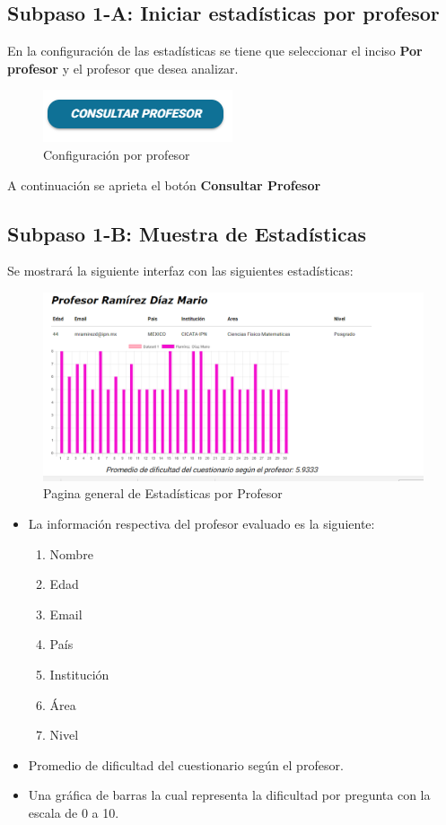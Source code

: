 \subsection{Subpaso 1-A: Iniciar estadísticas por profesor}
	En la configuración de las estadísticas se tiene que seleccionar el 
	inciso \textbf{Por profesor} y el profesor que desea analizar. 
		
	\begin{figure}[hbtp]

	\includegraphics[scale=0.5]{images/Interfaz/IUGS15_configuracionMes.PNG}
	\caption{Configuración por profesor }
	\end{figure}
	A continuación se aprieta el botón \textbf{Consultar Profesor}
	 
\subsection{Subpaso 1-B: Muestra de Estadísticas}
	Se mostrará la siguiente interfaz con las siguientes estadísticas:

	\begin{figure}[hbtp]
		\includegraphics[scale=0.5]{images/Interfaz/IUGS15_estadisticasMes.PNG}
		\caption{Pagina general de Estadísticas por Profesor}
	\end{figure}	
	
\begin{itemize}
	\item  La información respectiva del profesor evaluado es la siguiente:
	\begin{enumerate}
		
		\item Nombre
		\item Edad
		\item Email
		\item País
		\item Institución 
		\item Área 
		\item Nivel
		
		
	\end{enumerate}
	\item Promedio de dificultad del cuestionario según el profesor.
	
	\item Una gráfica de barras la cual representa la dificultad por pregunta 
	con la	escala de 0 a 10.
	
\end{itemize}
